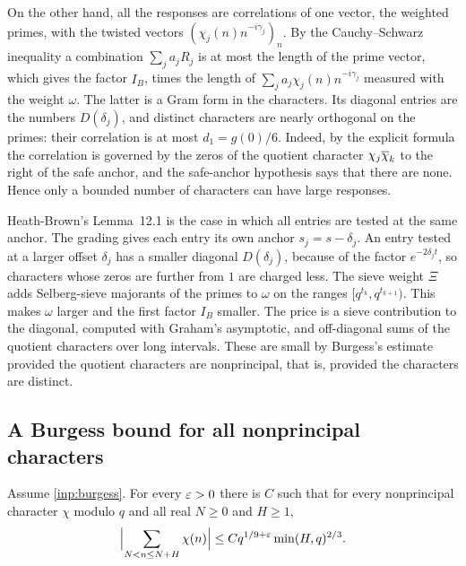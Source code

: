 On the other hand, all the responses are correlations of one vector, the weighted primes,
with the twisted vectors $(\chi_j(n)n^{-i\gamma_j})_n$. By the Cauchy--Schwarz inequality a
combination $\sum_ja_jR_j$ is at most the length of the prime vector, which gives the factor
$I_B$, times the length of $\sum_ja_j\chi_j(n)n^{-i\gamma_j}$ measured with the weight $\omega$. The
latter is a Gram form in the characters. Its diagonal entries are the numbers $D(\delta_j)$, and
distinct characters are nearly orthogonal on the primes: their correlation is at most
$d_1=g(0)/6$. Indeed, by the explicit formula the correlation is governed by the zeros of the
quotient character $\chi_j\overline{\chi}_k$ to the right of the safe anchor, and the safe-anchor
hypothesis says that there are none. Hence only a bounded number of characters can have large
responses.

Heath-Brown's Lemma~12.1 is the case in which all entries are tested at the same anchor. The
grading gives each entry its own anchor $s_j=s-\delta_j$. An entry tested at a larger offset
$\delta_j$ has a smaller diagonal $D(\delta_j)$, because of the factor $e^{-2\delta_jt}$, so characters
whose zeros are further from $1$ are charged less. The sieve weight $\Xi$ adds Selberg-sieve
majorants of the primes to $\omega$ on the ranges $[q^{t_k},q^{t_{k+1}})$. This makes $\omega$ larger and
the first factor $I_B$ smaller. The price is a sieve contribution to the diagonal, computed with
Graham's asymptotic, and off-diagonal sums of the quotient characters over long intervals. These
are small by Burgess's estimate provided the quotient characters are nonprincipal, that is,
provided the characters are distinct.

\subsection{A Burgess bound for all nonprincipal characters}

\begin{lemma}\label{lem:burgessall}
Assume \cref{inp:burgess}. For every $\varepsilon>0$ there is $C$ such that for every nonprincipal
character $\chi$ modulo $q$ and all real $N\ge0$ and $H\ge1$,
\[
  \Bigl|\sum_{N<n\le N+H}\chi(n)\Bigr|\le Cq^{1/9+\varepsilon}\min(H,q)^{2/3}.
\]
\end{lemma}

